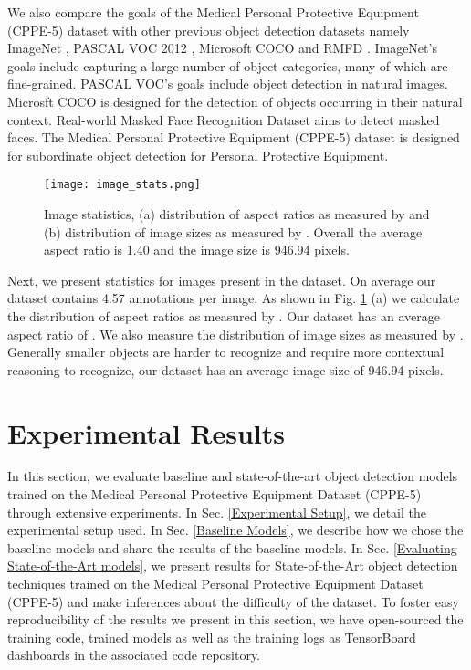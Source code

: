 \documentclass{article}
\begin{document}
We also compare the goals of the Medical Personal Protective Equipment (CPPE-5) dataset with other previous object detection datasets namely ImageNet \cite{deng2009imagenet}, PASCAL VOC 2012 \cite{pascal-voc-2012}, Microsoft COCO \cite{lin2014microsoft} and RMFD \cite{wang2020masked}. ImageNet's goals include capturing a large number of object categories, many of which are fine-grained. PASCAL VOC’s goals include object detection in natural images. Microsft COCO is designed for the detection of objects occurring in their natural context. Real-world Masked Face Recognition Dataset aims to detect masked faces. The Medical Personal Protective Equipment (CPPE-5) dataset is designed for subordinate object detection for Personal Protective Equipment.

\begin{figure}
    \centering
    \texttt{[image: image\_stats.png]}
    \caption{Image statistics, (a) distribution of aspect ratios as measured by  and (b) distribution of image sizes as measured by . Overall the average aspect ratio is 1.40 and the image size is 946.94 pixels.}
  \label{fig:image-stats}
\end{figure}

Next, we present statistics for images present in the dataset. On average our dataset contains 4.57 annotations per image. As shown in Fig. \ref{fig:image-stats} (a) we calculate the distribution of aspect ratios as measured by . Our dataset has an average aspect ratio of . We also measure the distribution of image sizes as measured by . Generally smaller objects are harder to recognize and require more contextual reasoning to recognize, our dataset has an average image size of 946.94 pixels.

\section{Experimental Results}
\label{Experimental Results}

In this section, we evaluate baseline and state-of-the-art object detection models trained on the Medical Personal Protective Equipment Dataset (CPPE-5) through extensive experiments. In Sec. \ref{Experimental Setup}, we detail the experimental setup used. In Sec. \ref{Baseline Models}, we describe how we chose the baseline models and share the results of the baseline models. In Sec. \ref{Evaluating State-of-the-Art models}, we present results for State-of-the-Art object detection techniques trained on the Medical Personal Protective Equipment Dataset (CPPE-5) and make inferences about the difficulty of the dataset. To foster easy reproducibility of the results we present in this section, we have open-sourced the training code, trained models as well as the training logs as TensorBoard \cite{tensorflow2015-whitepaper} dashboards in the associated code repository.
\end{document}
